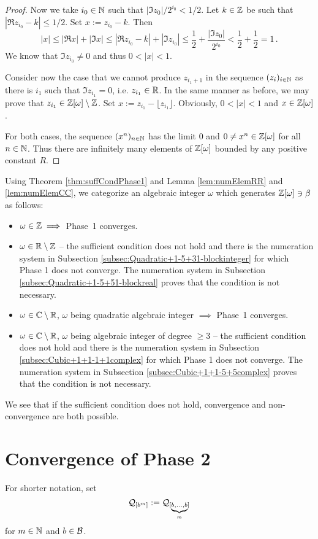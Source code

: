 \begin{proof}
Now we take $i_0\in\mathbb{N}$ such that $|\Im z_0|/2^{i_0}< 1/2$. Let $k\in\mathbb{Z}$ be such that $|\Re z_{i_0} -k|\leq 1/2$. Set $x:= z_{i_0}-k$. Then
$$
|x|\leq |\Re x| +|\Im x| \leq  |\Re z_{i_0} -k| + |\Im z_{i_0}| \leq \frac{1}{2} + \frac{|\Im z_0|}{2^{i_0}} < \frac{1}{2} +\frac{1}{2}=1\,.
$$
We know that $\Im z_{i_0} \neq 0$ and thus $0<|x|<1$.

Consider now the case that we cannot produce $z_{i_1+1}$  in the sequence $(z_i)_{i\in\mathbb{N}}$ as there is ${i_1}$ such that $\Im z_{i_1} = 0$, i.e. $z_{i_1}\in\mathbb{R}$. In the same manner as before, we may prove that  $z_{i_1} \in \mathbb{Z}[\omega]\setminus \mathbb{Z}$. Set $x:= z_{i_1}- \lfloor z_{i_1} \rfloor$. Obviously, $0<|x|<1$ and $x\in\mathbb{Z}[\omega]$.

For both cases, the sequence $(x^n)_{n\in\mathbb{N}}$ has the limit 0 and $0\neq x^n\in\mathbb{Z}[\omega]$ for all $n\in\mathbb{N}$. Thus there are infinitely many elements of $\mathbb{Z}[\omega]$ bounded by any positive constant $R$. 
\end{proof}


Using Theorem \ref{thm:suffCondPhase1} and Lemma \ref{lem:numElemRR} and \ref{lem:numElemCC}, we categorize an algebraic integer $\omega$ which generates $\mathbb{Z}[\omega] \ni \beta$ as follows:

\begin{itemize}
    \item $\omega \in \mathbb{Z} \implies$ Phase~1 converges.
    \item $\omega \in \mathbb{R}\setminus\mathbb{Z}$ -- the sufficient condition does not hold and there is the numeration system in Subsection \ref{subsec:Quadratic+1-5+31-blockinteger} for which Phase 1 does not converge. The numeration system in Subsection \ref{subsec:Quadratic+1-5+51-blockreal} proves that the condition is not necessary.
    \item $\omega \in \mathbb{C}\setminus\mathbb{R}$, $\omega$ being quadratic algebraic integer $\implies$ Phase~1 converges.
    \item $\omega \in \mathbb{C}\setminus\mathbb{R}$, $\omega$ being algebraic integer of degree $\geq 3$ -- the sufficient condition does not hold and there is the numeration system in Subsection \ref{subsec:Cubic+1+1-1+1complex} for which Phase 1 does not converge. The numeration system in Subsection \ref{subsec:Cubic+1+1-5+5complex} proves that the condition is not necessary.
\end{itemize}
We see that if the sufficient condition does not hold, convergence and non-convergence are both possible.
\section{Convergence of Phase 2}
\label{sec:convergencePhase2}
For shorter notation, set 
$$
\mathcal{Q}_{[b^{m}]}:=\mathcal{Q}_{[\underbrace{\scriptstyle b,\dots,b}_m]}
$$ for $m \in \mathbb{N}$ and $b\in\mathcal{B}$.

